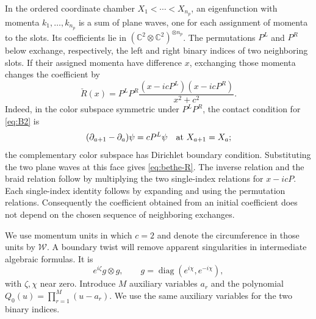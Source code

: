 In the ordered coordinate chamber $X_1<\cdots<X_{n_p}$, an eigenfunction
with momenta $k_1,\ldots,k_{n_p}$ is a sum of plane waves, one for each
assignment of momenta to the slots.  Its coefficients lie in
$(\mathbb C^2\otimes\mathbb C^2)^{\otimes n_p}$.  The permutations $P^L$
and $P^R$ below exchange, respectively, the left and right binary indices
of two neighboring slots.  If their assigned momenta have difference $x$,
exchanging those momenta changes the coefficient by
\begin{equation}\label{eq:bethe-R}
 \check R(x)=P^LP^R
       \frac{(x-icP^L)(x-icP^R)}{x^2+c^2}.
\end{equation}
Indeed, in the color subspace symmetric under $P^LP^R$, the contact condition
for \eqref{eq:B2} is
\[
 (\partial_{a+1}-\partial_a)\psi=cP^L\psi
       \quad\hbox{at }X_{a+1}=X_a;
\]
the complementary color subspace has Dirichlet boundary condition.  Substituting
the two plane waves at this face gives \eqref{eq:bethe-R}.  The inverse
relation and the braid relation follow by multiplying the two single-index
relations for $x-icP$.  Each single-index identity follows by expanding and
using the permutation relations.  Consequently the coefficient obtained
from an initial coefficient does not depend on the chosen sequence of
neighboring exchanges.

We use momentum units in which $c=2$ and denote the circumference in those
units by $\mathcal W$.  A boundary twist will remove apparent singularities
in intermediate algebraic formulas.  It is
\[
 e^{i\zeta}g\otimes g,
 \qquad g=\operatorname{diag}(e^{i\chi},e^{-i\chi}),
\]
with $\zeta,\chi$ near zero.  Introduce $M$ auxiliary variables $a_r$ and the
polynomial $Q_0(u)=\prod_{r=1}^M(u-a_r)$.  We use the same auxiliary variables
for the two binary indices.

